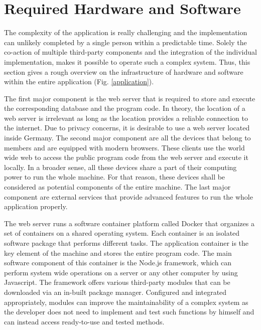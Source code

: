 \documentclass[12pt,numbers=noenddot,parskip,bibliography=totocnumbered,listof=totocnumbered,draft]{scrreprt}
\begin{document}
\section{Required Hardware and Software}
The complexity of the application is really challenging and the implementation can unlikely completed by a single person within a predictable time. Solely the co-action of multiple third-party components and the integration of the individual implementation, makes it possible to operate such a complex system. Thus, this section gives a rough overview on the infrastructure of hardware and software within the entire application (Fig. \ref{application}).

The first major component is the web server that is required to store and execute the corresponding database and the program code. In theory, the location of a web server is irrelevant as long as the location provides a reliable connection to the internet. Due to privacy concerns, it is desirable to use a web server located inside Germany. The second major component are all the devices that belong to members and are equipped with modern browsers. These clients use the world wide web to access the public program code from the web server and execute it locally. In a broader sense, all these devices share a part of their computing power to run the whole machine. For that reason, these devices shall be considered as potential components of the entire machine. The last major component are external services that provide advanced features to run the whole application properly.

The web server runs a software container platform called \mbox{Docker} \citep{docker} that organizes a set of containers on a shared operating system. Each container is an isolated software package that performs different tasks. The application container is the key element of the machine and stores the entire program code. The main software component of this container is the \mbox{Node.js}\citep{nodejs} framework, which can perform system wide operations on a server or any other computer by using \mbox{Javascript}. The framework offers various third-party modules that can be downloaded via an in-built package manager. Configured and integrated appropriately, modules can improve the maintainability of a complex system as the developer does not need to implement and test such functions by himself and can instead access ready-to-use and tested methods.
\end{document}
